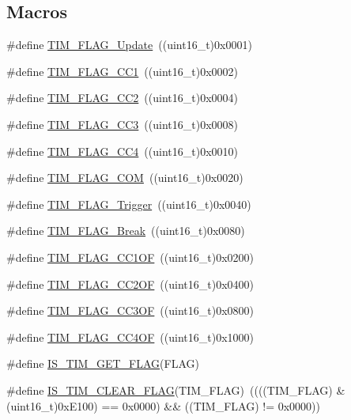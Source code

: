 \subsection*{Macros}
\begin{DoxyCompactItemize}
\item 
\#define \hyperlink{group___t_i_m___flags_ga97eba66f792c88e08131bd0d2a0e530d}{T\+I\+M\+\_\+\+F\+L\+A\+G\+\_\+\+Update}~((uint16\+\_\+t)0x0001)
\item 
\#define \hyperlink{group___t_i_m___flags_gaa7eb8be054b9bd217a9abb1c8687cc55}{T\+I\+M\+\_\+\+F\+L\+A\+G\+\_\+\+C\+C1}~((uint16\+\_\+t)0x0002)
\item 
\#define \hyperlink{group___t_i_m___flags_ga9cae242f1c51b31839ffc5bc007c82a7}{T\+I\+M\+\_\+\+F\+L\+A\+G\+\_\+\+C\+C2}~((uint16\+\_\+t)0x0004)
\item 
\#define \hyperlink{group___t_i_m___flags_ga052c380f922219659810e4fceb574a7c}{T\+I\+M\+\_\+\+F\+L\+A\+G\+\_\+\+C\+C3}~((uint16\+\_\+t)0x0008)
\item 
\#define \hyperlink{group___t_i_m___flags_gafd0dc57b56941f8b8250d66e289542db}{T\+I\+M\+\_\+\+F\+L\+A\+G\+\_\+\+C\+C4}~((uint16\+\_\+t)0x0010)
\item 
\#define \hyperlink{group___t_i_m___flags_gad454d70205ce5bbf3b3c0e7e43d6df62}{T\+I\+M\+\_\+\+F\+L\+A\+G\+\_\+\+C\+OM}~((uint16\+\_\+t)0x0020)
\item 
\#define \hyperlink{group___t_i_m___flags_gaeca2f17eea738dbec7eee8ecbe442814}{T\+I\+M\+\_\+\+F\+L\+A\+G\+\_\+\+Trigger}~((uint16\+\_\+t)0x0040)
\item 
\#define \hyperlink{group___t_i_m___flags_ga166571a1d5ca2bfca5d923eaa22f6deb}{T\+I\+M\+\_\+\+F\+L\+A\+G\+\_\+\+Break}~((uint16\+\_\+t)0x0080)
\item 
\#define \hyperlink{group___t_i_m___flags_ga38dfb7d1ed00af77d70bc3be28500108}{T\+I\+M\+\_\+\+F\+L\+A\+G\+\_\+\+C\+C1\+OF}~((uint16\+\_\+t)0x0200)
\item 
\#define \hyperlink{group___t_i_m___flags_ga4df0c71d3e695c214d49802942e04590}{T\+I\+M\+\_\+\+F\+L\+A\+G\+\_\+\+C\+C2\+OF}~((uint16\+\_\+t)0x0400)
\item 
\#define \hyperlink{group___t_i_m___flags_gac81f24eaffdf83c2db9d2e6078a00919}{T\+I\+M\+\_\+\+F\+L\+A\+G\+\_\+\+C\+C3\+OF}~((uint16\+\_\+t)0x0800)
\item 
\#define \hyperlink{group___t_i_m___flags_gafc8b04654766d98ba2c6fed601895a20}{T\+I\+M\+\_\+\+F\+L\+A\+G\+\_\+\+C\+C4\+OF}~((uint16\+\_\+t)0x1000)
\item 
\#define \hyperlink{group___t_i_m___flags_ga6406de8131ae53ee29740c3e8627b098}{I\+S\+\_\+\+T\+I\+M\+\_\+\+G\+E\+T\+\_\+\+F\+L\+AG}(F\+L\+AG)
\item 
\#define \hyperlink{group___t_i_m___flags_gae60a1b5900de8354b2a4f017b2bd4f94}{I\+S\+\_\+\+T\+I\+M\+\_\+\+C\+L\+E\+A\+R\+\_\+\+F\+L\+AG}(T\+I\+M\+\_\+\+F\+L\+AG)~((((T\+I\+M\+\_\+\+F\+L\+AG) \& (uint16\+\_\+t)0x\+E100) == 0x0000) \&\& ((\+T\+I\+M\+\_\+\+F\+L\+A\+G) != 0x0000))
\end{DoxyCompactItemize}


